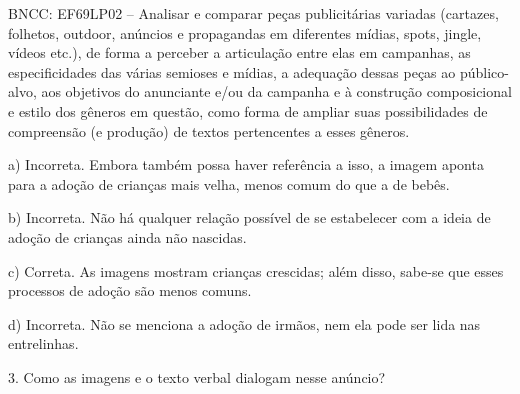 \begin{itemize}
\begin{itemize}
{\begin{itemize}
\begin{itemize}
\begin{escolha}
\begin{escolha}
BNCC: EF69LP02 -- Analisar e comparar peças publicitárias variadas
(cartazes, folhetos, outdoor, anúncios e propagandas em diferentes
mídias, spots, jingle, vídeos etc.), de forma a perceber a articulação
entre elas em campanhas, as especificidades das várias semioses e
mídias, a adequação dessas peças ao público-alvo, aos objetivos do
anunciante e/ou da campanha e à construção composicional e estilo dos
gêneros em questão, como forma de ampliar suas possibilidades de
compreensão (e produção) de textos pertencentes a esses gêneros.

a) Incorreta. Embora também possa haver referência a isso, a imagem
aponta para a adoção de crianças mais velha, menos comum do que a de
bebês.

b) Incorreta. Não há qualquer relação possível de se estabelecer com a
ideia de adoção de crianças ainda não nascidas.

c) Correta. As imagens mostram crianças crescidas; além disso, sabe-se
que esses processos de adoção são menos comuns.

d) Incorreta. Não se menciona a adoção de irmãos, nem ela pode ser lida
nas entrelinhas.

3. Como as imagens e o texto verbal dialogam nesse anúncio?

\end{escolha}
\end{escolha}
\end{itemize}
\end{itemize}}
\end{itemize}
\end{itemize}

